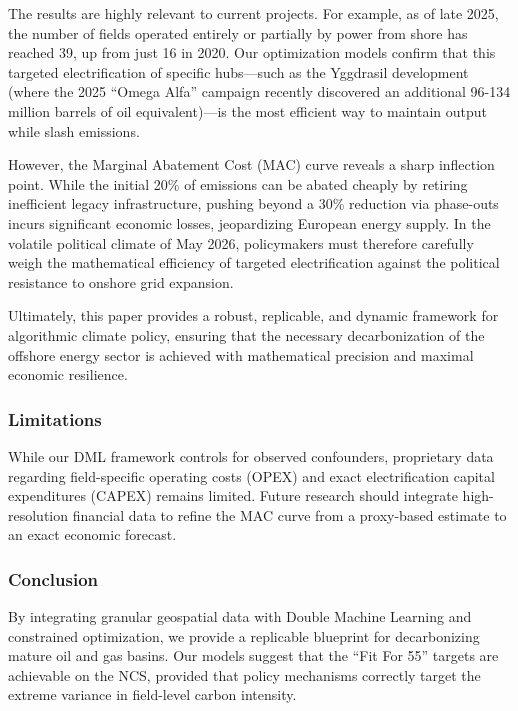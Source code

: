 \documentclass[
  11pt,
]{article}
\begin{document}
The results are highly relevant to current projects. For example, as of
late 2025, the number of fields operated entirely or partially by power
from shore has reached 39, up from just 16 in 2020. Our optimization
models confirm that this targeted electrification of specific
hubs---such as the Yggdrasil development (where the 2025 ``Omega Alfa''
campaign recently discovered an additional 96-134 million barrels of oil
equivalent)---is the most efficient way to maintain output while slash
emissions.

However, the Marginal Abatement Cost (MAC) curve reveals a sharp
inflection point. While the initial 20\% of emissions can be abated
cheaply by retiring inefficient legacy infrastructure, pushing beyond a
30\% reduction via phase-outs incurs significant economic losses,
jeopardizing European energy supply. In the volatile political climate
of May 2026, policymakers must therefore carefully weigh the
mathematical efficiency of targeted electrification against the
political resistance to onshore grid expansion.

Ultimately, this paper provides a robust, replicable, and dynamic
framework for algorithmic climate policy, ensuring that the necessary
decarbonization of the offshore energy sector is achieved with
mathematical precision and maximal economic resilience.

\subsubsection{Limitations}\label{limitations}

While our DML framework controls for observed confounders, proprietary
data regarding field-specific operating costs (OPEX) and exact
electrification capital expenditures (CAPEX) remains limited. Future
research should integrate high-resolution financial data to refine the
MAC curve from a proxy-based estimate to an exact economic forecast.

\subsubsection{Conclusion}\label{conclusion}

By integrating granular geospatial data with Double Machine Learning and
constrained optimization, we provide a replicable blueprint for
decarbonizing mature oil and gas basins. Our models suggest that the
``Fit For 55'' targets are achievable on the NCS, provided that policy
mechanisms correctly target the extreme variance in field-level carbon
intensity.
\end{document}
